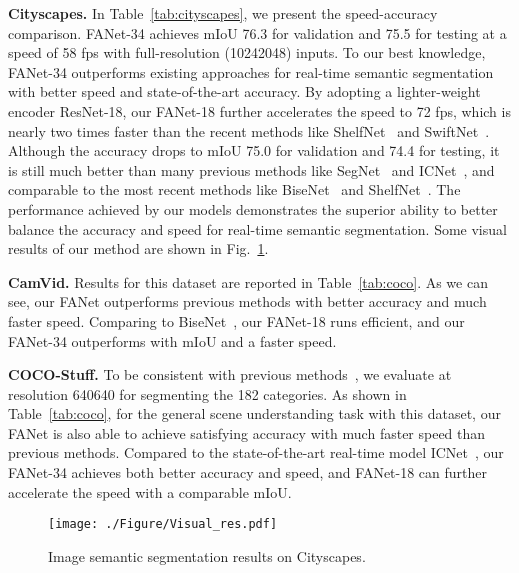 \noindent\textbf{Cityscapes.} In Table~\ref{tab:cityscapes}, we present the speed-accuracy comparison. 
FANet-34 achieves mIoU 76.3 for validation and  75.5 for testing at a speed of 58 fps with full-resolution (10242048) inputs. 
To our best knowledge, FANet-34 outperforms existing approaches for real-time semantic segmentation with better speed and state-of-the-art accuracy. 
By adopting a lighter-weight encoder ResNet-18, our FANet-18 further accelerates the speed to 72 fps, which is nearly two times faster than the recent methods like ShelfNet~\cite{Zhuang_2019_ICCV_Workshops} and SwiftNet~\cite{orsic2019defense}. 
Although the accuracy drops to mIoU 75.0 for validation and  74.4 for testing, it is still much better than many previous methods like SegNet~\cite{badrinarayanan2017segnet} and ICNet~\cite{zhao2018icnet}, and comparable to the most recent methods like BiseNet~\cite{yu2018bisenet} and ShelfNet~\cite{Zhuang_2019_ICCV_Workshops}. 
The performance achieved by our models demonstrates the superior ability to better balance the accuracy and speed for real-time semantic segmentation. Some visual results of our method are shown in Fig.~\ref{fig:visual_res}.

\noindent\textbf{CamVid.} Results for this dataset are reported in Table~\ref{tab:coco}. As we can see, our FANet outperforms previous methods with better accuracy and much faster speed. Comparing to BiseNet~\cite{yu2018bisenet}, our FANet-18 runs  efficient, and our FANet-34 outperforms with  mIoU and a faster speed.

\noindent\textbf{COCO-Stuff.} To be consistent with previous methods~\cite{zhao2018icnet}, we evaluate at resolution 640640 for segmenting the 182 categories. As shown in Table~\ref{tab:coco}, for the general scene understanding task with this dataset, our FANet is also able to achieve satisfying accuracy with much faster speed than previous methods. Compared to the state-of-the-art real-time model ICNet~\cite{zhao2018icnet}, our FANet-34 achieves both better accuracy and speed, and FANet-18 can further accelerate the speed with a comparable mIoU.





\begin{figure}
\centering
\texttt{[image: ./Figure/Visual\_res.pdf]}
\vspace{-0.2cm}
\caption{\small{Image semantic segmentation results on Cityscapes.}}
\label{fig:visual_res} 
\vspace{-0.2cm}
\end{figure}


